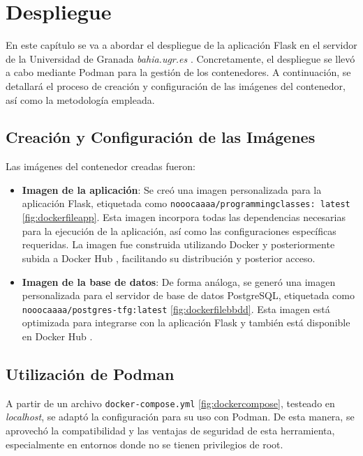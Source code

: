\chapter{Despliegue} \label{chap:despliegue}

En este capítulo se va a abordar el despliegue de la aplicación Flask en el servidor de la Universidad de Granada \textit{bahia.ugr.es} \cite{bahia}. Concretamente, el despliegue se llevó a cabo mediante Podman \cite{podman} para la gestión de los contenedores. A continuación, se detallará el proceso de creación y configuración de las imágenes del contenedor, así como la metodología empleada.

\section{Creación y Configuración de las Imágenes}

Las imágenes del contenedor creadas fueron:

\begin{itemize}
    \item \textbf{Imagen de la aplicación}: Se creó una imagen personalizada para la aplicación Flask, etiquetada como \texttt{nooocaaaa/programmingclasses: latest} \ref{fig:dockerfileapp}. Esta imagen incorpora todas las dependencias necesarias para la ejecución de la aplicación, así como las configuraciones específicas requeridas. La imagen fue construida utilizando Docker y posteriormente subida a Docker Hub \cite{dockerhub}, facilitando su distribución y posterior acceso. 
    \item \textbf{Imagen de la base de datos}:  De forma análoga, se generó una imagen personalizada para el servidor de base de datos PostgreSQL, etiquetada como \texttt{nooocaaaa/postgres-tfg:latest} \ref{fig:dockerfilebbdd}. Esta imagen está optimizada para integrarse con la aplicación Flask y también está disponible en Docker Hub \cite{dockerhub2}.
\end{itemize}

\section{Utilización de Podman}

A partir de un archivo \texttt{docker-compose.yml} \ref{fig:dockercompose}, testeado en \textit{localhost}, se adaptó la configuración para su uso con Podman. De esta manera, se aprovechó la compatibilidad y las ventajas de seguridad de esta herramienta, especialmente en entornos donde no se tienen privilegios de root.

